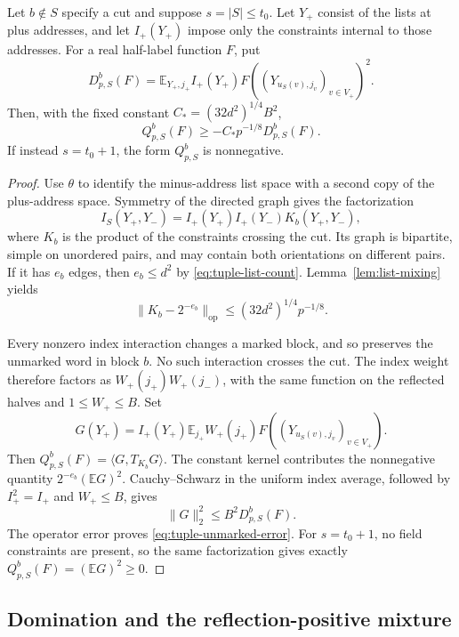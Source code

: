 \begin{lemma}
\label{lem:unmarked-error}
Let \(b\notin S\) specify a cut and suppose \(s=|S|\le t_0\).
Let \(Y_+\) consist of the lists at plus addresses, and let
\(I_+(Y_+)\) impose only the constraints internal to those addresses.
For a real half-label function \(F\), put
\[
 D_{p,S}^{b}(F)=\mathbb E_{Y_+,j_+}I_+(Y_+)
 F((Y_{u_S(v),j_v})_{v\in V_+})^2.
\]
Then, with the fixed constant \(C_*=(32d^2)^{1/4}B^2\),
\begin{equation}
 Q_{p,S}^{b}(F)\ge-C_*p^{-1/8}D_{p,S}^{b}(F).
 \label{eq:tuple-unmarked-error}
\end{equation}
If instead \(s=t_0+1\), the form \(Q_{p,S}^{b}\) is nonnegative.
\end{lemma}

\begin{proof}
Use \(\theta\) to identify the minus-address list space with a
second copy of the plus-address space.  Symmetry of the directed
graph gives the factorization
\[
 I_S(Y_+,Y_-)=I_+(Y_+)I_+(Y_-)K_b(Y_+,Y_-),
\]
where \(K_b\) is the product of the constraints crossing the cut.
Its graph is bipartite, simple on unordered pairs, and may contain
both orientations on different pairs.  If it has \(e_b\) edges,
then \(e_b\le d^2\) by \eqref{eq:tuple-list-count}.
Lemma~\ref{lem:list-mixing} yields
\[
 \|K_b-2^{-e_b}\|_{\mathrm{op}}
 \le(32d^2)^{1/4}p^{-1/8}.
\]

Every nonzero index interaction changes a marked block, and so
preserves the unmarked word in block \(b\).  No such interaction
crosses the cut.  The index weight therefore factors as
\(W_+(j_+)W_+(j_-)\), with the same function on the reflected
halves and \(1\le W_+\le B\).  Set
\[
 G(Y_+)=I_+(Y_+)\mathbb E_{j_+}W_+(j_+)
 F((Y_{u_S(v),j_v})_{v\in V_+}).
\]
Then \(Q_{p,S}^{b}(F)=\langle G,T_{K_b}G\rangle\).
The constant kernel contributes the nonnegative quantity
\(2^{-e_b}(\mathbb E G)^2\).  Cauchy--Schwarz in the uniform index
average, followed by \(I_+^2=I_+\) and \(W_+\le B\), gives
\[
 \|G\|_2^2\le B^2D_{p,S}^{b}(F).
\]
The operator error proves \eqref{eq:tuple-unmarked-error}.
For \(s=t_0+1\), no field constraints are present, so the same
factorization gives exactly \(Q_{p,S}^{b}(F)=(\mathbb E G)^2\ge0\).
\end{proof}

\subsection{Domination and the reflection-positive mixture}

